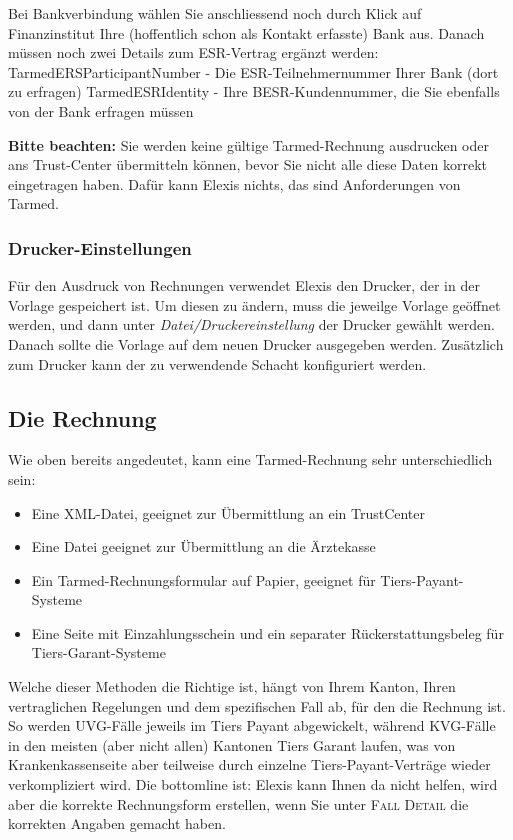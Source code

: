 Bei Bankverbindung wählen Sie anschliessend noch durch Klick auf \glqq
Finanzinstitut\grqq{}  Ihre (hoffentlich schon als Kontakt erfasste)
 Bank aus. Danach müssen noch zwei Details zum ESR-Vertrag ergänzt werden:
TarmedERSParticipantNumber - Die ESR-Teilnehmernummer Ihrer Bank (dort zu erfragen)
TarmedESRIdentity - Ihre BESR-Kundennummer, die Sie ebenfalls von der Bank erfragen müssen

\textbf{Bitte beachten:} Sie werden keine gültige Tarmed-Rechnung ausdrucken
oder ans Trust-Center übermitteln können, bevor Sie nicht alle diese Daten
korrekt eingetragen haben. Dafür kann Elexis nichts, das sind Anforderungen von
Tarmed.

\subsubsection{Drucker-Einstellungen}

Für den Ausdruck von Rechnungen verwendet Elexis den Drucker, der in der Vorlage
gespeichert ist. Um diesen zu ändern, muss die jeweilge Vorlage geöffnet werden,
und dann unter \textit{Datei/Druckereinstellung} der Drucker gewählt werden.
Danach sollte die Vorlage auf dem neuen Drucker ausgegeben werden. Zusätzlich
zum Drucker kann der zu verwendende Schacht konfiguriert werden.

\subsection{Die Rechnung}

Wie oben bereits angedeutet, kann eine Tarmed-Rechnung sehr unterschiedlich sein:

\begin{itemize}
 \item Eine XML-Datei, geeignet zur Übermittlung an ein TrustCenter
\item Eine Datei geeignet zur Übermittlung an die Ärztekasse
\item Ein Tarmed-Rechnungsformular auf Papier, geeignet für Tiers-Payant-Systeme
\item  Eine Seite mit Einzahlungsschein und ein separater Rückerstattungsbeleg für Tiers-Garant-Systeme
\end{itemize}

Welche dieser Methoden die Richtige ist, hängt von Ihrem Kanton, Ihren vertraglichen Regelungen und dem spezifischen Fall ab,
für den die Rechnung ist. So werden UVG-Fälle jeweils im Tiers Payant abgewickelt, während KVG-Fälle in den meisten (aber nicht allen) Kantonen Tiers Garant laufen, was von Krankenkassenseite aber teilweise durch einzelne Tiers-Payant-Verträge
wieder verkompliziert wird. Die bottomline ist: Elexis kann Ihnen da nicht helfen, wird aber die korrekte Rechnungsform erstellen, wenn Sie unter \textsc{Fall Detail}
die korrekten Angaben gemacht haben.

